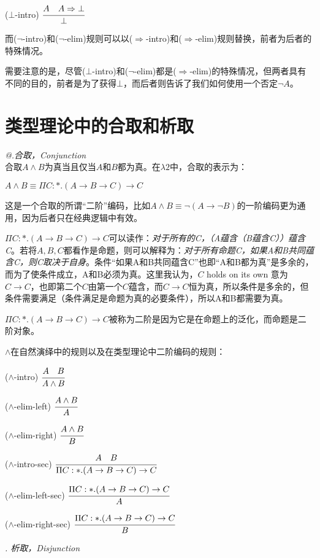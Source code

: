 \documentclass[UTF8]{article}
\makeatletter
\newcommand{\Rmnum}[1]{\expandafter\@slowromancap\romannumeral #1@}
\makeatother
\begin{document}
		($\bot$-intro) $\cfrac{A\ \ \ A\Rightarrow\bot}{\bot}$
		
		而($\neg$-intro)和($\neg$-elim)规则可以以($\Rightarrow$-intro)和($\Rightarrow$-elim)规则替换，前者为后者的特殊情况。
		
		需要注意的是，尽管($\bot$-intro)和($\neg$-elim)都是($\Rightarrow$-elim)的特殊情况，但两者具有不同的目的，前者是为了获得$\bot$，而后者则告诉了我们如何使用一个否定$\neg A$。
		
	\section{类型理论中的合取和析取}
	\noindent
	\textit{\Rmnum{1}.合取，Conjunction}\\
	合取$A\land B$为真当且仅当$A$和$B$都为真。在$\lambda{2}$中，合取的表示为：
	
		$A\land B\equiv\Pi C:*.(A\rightarrow B\rightarrow C)\rightarrow C$
		
		这是一个合取的所谓“二阶”编码，比如$A\land B\equiv\neg(A\rightarrow\neg B)$的一阶编码更为通用，因为后者只在经典逻辑中有效。
		
		$\Pi C:*.(A\rightarrow B\rightarrow C)\rightarrow C$可以读作：\textit{对于所有的C，（A蕴含（B蕴含C））蕴含C}。若将$A,B,C$都看作是命题，则可以解释为：\textit{对于所有命题C，如果A和B共同蕴含C，则C取决于自身}。条件“如果A和B共同蕴含C”也即“A和B都为真”是多余的，而为了使条件成立，A和B必须为真。这里我认为，$C$ holds on its own 意为 $C\rightarrow C$，也即第二个$C$由第一个$C$蕴含，而$C\rightarrow C$恒为真，所以条件是多余的，但条件需要满足（条件满足是命题为真的必要条件），所以A和B都需要为真。
		
		$\Pi C:*.(A\rightarrow B\rightarrow C)\rightarrow C$被称为二阶是因为它是在命题上的泛化，而命题是二阶对象。
		
		$\land$在自然演绎中的规则以及在类型理论中二阶编码的规则：
		
		($\land$-intro) $\cfrac{A\ \ \ B}{A\land B}$
		
		($\land$-elim-left) $\cfrac{A\land B}{A}$
		
		($\land$-elim-right) $\cfrac{A\land B}{B}$
		
		($\land$-intro-sec) $\cfrac{A\ \ \ B}{\Pi C:*.(A\rightarrow B\rightarrow C)\rightarrow C}$ 
		
		($\land$-elim-left-sec) $\cfrac{\Pi C:*.(A\rightarrow B\rightarrow C)\rightarrow C}{A}$
		
		($\land$-elim-right-sec) $\cfrac{\Pi C:*.(A\rightarrow B\rightarrow C)\rightarrow C}{B}$ 
		
	\noindent
	\textit{. 析取，Disjunction}\\
	
\end{document}
